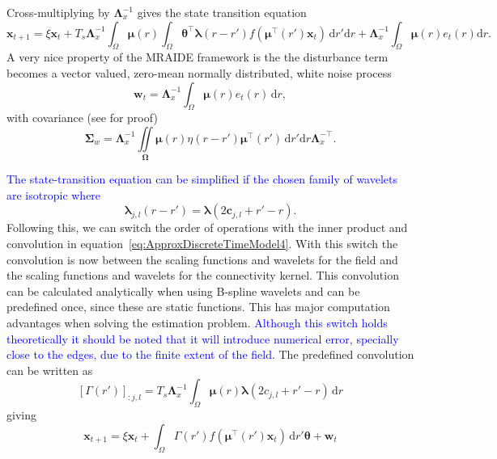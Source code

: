 \documentclass[11pt,draftcls,onecolumn,peerreview]{IEEEtran}
\newcommand{\parham}[1]{\textcolor{blue}{#1}}
\begin{document}
Cross-multiplying by $\mathbf{\Lambda}_{x}^{-1}$ gives the state transition equation
\begin{equation}\label{eq:ApproxDiscreteTimeModel4}
	\mathbf{x}_{t+1} = 
	\xi \mathbf{x}_t + 
	T_s \mathbf{\Lambda}_{x}^{-1} \int_{\Omega}\boldsymbol\mu\left(r\right)\int_\Omega { 
	    \boldsymbol\theta^\top\boldsymbol\lambda\left(r-r'\right)
	    f\left(\boldsymbol\mu^\top\left(r'\right)\mathbf{x}_t\right) 
	\, \mathrm{d}r'\mathrm{d}r}  
	+ \mathbf{\Lambda}_{x}^{-1}\int_{\Omega}\boldsymbol{\mu}\left(r\right) e_t\left(r\right) \mathrm{d}r.
\end{equation}
A very nice property of the MRAIDE framework is the the disturbance term becomes a vector valued, zero-mean normally distributed, white noise process 
\begin{equation}\label{eq:Disturbance}
\mathbf w_t= \mathbf{\Lambda}_{x}^{-1}\int_{\Omega}\boldsymbol\mu \left(r\right)e_t\left(r\right)\,\mathrm{d}r,
\end{equation}
with covariance (see \cite{Freestone2011} for proof)
\begin{equation}\label{eq:CovMatrix}
\boldsymbol\Sigma_w =\mathbf{\Lambda}_{x}^{-1}\iint\limits_{\boldsymbol\Omega}\boldsymbol\mu\left(r\right) \eta\left(r-r'\right)\boldsymbol\mu^{\top}\left(r'\right)\,\mathrm{d}r'\mathrm{d}r\mathbf{\Lambda}_{x}^{-\top}.
\end{equation} 

\parham{The state-transition equation can be simplified if the chosen family of wavelets are isotropic  where}
\begin{equation}
	\boldsymbol{\lambda}_{j,l}(r-r') = \boldsymbol{\lambda}(2\mathbf{c}_{j,l}+r'-r). 
\end{equation}
Following this, we can switch the order of operations with the inner product and convolution in equation~\eqref{eq:ApproxDiscreteTimeModel4}. With this switch the convolution is now between the scaling functions and wavelets for the field and the scaling functions and wavelets for the connectivity kernel. This convolution can be calculated analytically when using B-spline wavelets and can be predefined once, since these are static functions. This has major computation advantages when solving the estimation problem. \parham{Although this switch holds theoretically it should be noted that it will introduce numerical error, specially close to the edges, due to the finite extent of the field. } The predefined convolution can be written as
\begin{equation}
	\left[\Gamma(r')\right]_{:j,l} = T_s \mathbf{\Lambda}_{x}^{-1}\int_{\Omega} \boldsymbol\mu\left(r\right)\boldsymbol\lambda\left(2c_{j,l} + r'-r\right) \,\mathrm{d}r
\end{equation}
giving
\begin{equation}
	\mathbf{x}_{t+1} = 
	\xi \mathbf{x}_t + 
	\int_{\Omega} \Gamma\left(r'\right)f\left(\boldsymbol\mu^\top\left(r'\right) \mathbf{x}_t\right) 
	\, \mathrm{d}r' \boldsymbol\theta
	+ \mathbf w_t
\end{equation}
\end{document}
